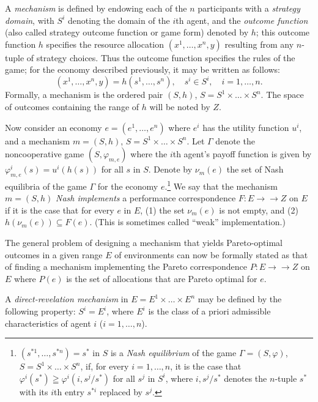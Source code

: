 \documentclass[12pt, letterpaper]{article}
\begin{document}
A \textit{mechanism} is defined by endowing each of the $n$ participants with a \textit{strategy domain}, with $S^i$ denoting the domain of the $i$th agent, and the \textit{outcome function} (also called strategy outcome function or game form) denoted by $h$; this outcome function $h$ specifies the resource allocation $(x^1, \dots, x^n, y)$ resulting from any $n$-tuple of strategy choices. Thus the outcome function specifies the rules of the game; for the economy described previously, it may be written as follows:
\[
(x^1, \dots, x^n, y) = h(s^1, \dots, s^n), \quad s^i \in S^i, \quad i = 1, \dots, n.
\]
Formally, a mechanism is the ordered pair $(S, h)$, $S = S^1 \times \dots \times S^n$. The space of outcomes containing the range of $h$ will be noted by $Z$.

Now consider an economy $e = (e^1, \dots, e^n)$ where $e^i$ has the utility function $u^i$, and a mechanism $m = (S, h)$, $S = S^1 \times \dots \times S^n$. Let $\Gamma$ denote the noncooperative game $(S, \varphi_{m,e})$ where the $i$th agent's payoff function is given by $\varphi^i_{m,e}(s) = u^i(h(s))$ for all $s$ in $S$. Denote by $\nu_m(e)$ the set of Nash equilibria of the game $\Gamma$ for the economy $e$.\footnote{$(s^{*1}, \dots, s^{*n}) = s^*$ in $S$ is a \textit{Nash equilibrium} of the game $\Gamma = (S, \varphi)$, $S = S^1 \times \dots \times S^n$, if, for every $i = 1, \dots, n$, it is the case that $\varphi^i(s^*) \geqq \varphi^i(i, s^j/s^*)$ for all $s^j$ in $S^i$, where $i, s^j/s^*$ denotes the $n$-tuple $s^*$ with its $i$th entry $s^{*i}$ replaced by $s^j$.} We say that the mechanism $m = (S, h)$ \textit{Nash implements} a performance correspondence $F \colon E \to\to Z$ on $E$ if it is the case that for every $e$ in $E$, (1) the set $\nu_m(e)$ is not empty, and (2) $h(\nu_m(e)) \subseteq F(e)$. (This is sometimes called ``weak'' implementation.)

The general problem of designing a mechanism that yields Pareto-optimal outcomes in a given range $E$ of environments can now be formally stated as that of finding a mechanism implementing the Pareto correspondence $P \colon E \to\to Z$ on $E$ where $P(e)$ is the set of allocations that are Pareto optimal for $e$.

A \textit{direct-revelation mechanism} in $E = E^1 \times \dots \times E^n$ may be defined by the following property: $S^i = E^i$, where $E^i$ is the class of a priori admissible characteristics of agent $i$ ($i = 1, \dots, n$).
\end{document}
